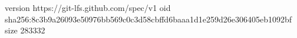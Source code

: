version https://git-lfs.github.com/spec/v1
oid sha256:8c3b9a26093e50976bb569c0c3d58cbffd6baaa1d1e259d26e306405eb1092bf
size 283332
